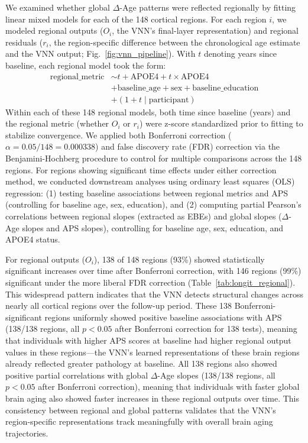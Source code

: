 \documentclass[conference]{IEEEtran}
\begin{document}
We examined whether global $\Delta$-Age patterns were reflected regionally by fitting linear mixed models for each of the 148 cortical regions. For each region $i$, we modeled regional outputs ($O_i$, the VNN's final-layer representation) and regional residuals ($r_i$, the region-specific difference between the chronological age estimate and the VNN output; Fig.~\ref{fig:vnn_pipeline}). With $t$ denoting years since baseline, each regional model took the form:
\begin{align*}
\text{regional\_metric} &\sim t + \text{APOE4} + t \times \text{APOE4} \\
& + \text{baseline\_age} + \text{sex} + \text{baseline\_education} \\
& + (1 + t \mid \text{participant})
\end{align*}
Within each of these 148 regional models, both {time since baseline (years)} and the regional metric (whether $O_i$ or $r_i$) were z-score standardized prior to fitting to stabilize convergence. We applied both Bonferroni correction ($\alpha = 0.05/148 = 0.000338$) and false discovery rate (FDR) correction via the Benjamini-Hochberg procedure to control for multiple comparisons across the 148 regions. For regions showing significant time effects under either correction method, we conducted downstream analyses using ordinary least squares (OLS) regression: (1) testing baseline associations between regional metrics and APS (controlling for baseline age, sex, education), and (2) computing partial Pearson's correlations between regional slopes (extracted as EBEs) and global slopes ($\Delta$-Age slopes and APS slopes), controlling for baseline age, sex, education, and APOE4 status.

For regional outputs ($O_i$), 138 of 148 regions (93\%) showed statistically significant increases over time after Bonferroni correction, with 146 regions (99\%) significant under the more liberal FDR correction (Table~\ref{tab:longit_regional}). This widespread pattern indicates that the VNN detects structural changes across nearly all cortical regions over the follow-up period. These 138 Bonferroni-significant regions uniformly showed positive baseline associations with APS (138/138 regions, all $p < 0.05$ after Bonferroni correction for 138 tests), meaning that individuals with higher APS scores at baseline had higher regional output values in these regions---the VNN's learned representations of these brain regions already reflected greater pathology at baseline. All 138 regions also showed positive partial correlations with global $\Delta$-Age slopes (138/138 regions, all $p < 0.05$ after Bonferroni correction), meaning that individuals with faster global brain aging also showed faster increases in these regional outputs over time. This consistency between regional and global patterns validates that the VNN's region-specific representations track meaningfully with overall brain aging trajectories.
\end{document}
